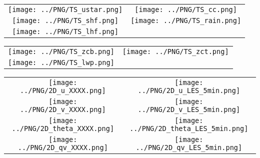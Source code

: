 \documentclass{article}
\begin{document}

\begin{table}
  \begin{tabular}{cc}
    \texttt{[image: ../PNG/TS\_ustar.png]} & \texttt{[image: ../PNG/TS\_cc.png]}   \\ 
    \texttt{[image: ../PNG/TS\_shf.png]}   & \texttt{[image: ../PNG/TS\_rain.png]}  \\
    \texttt{[image: ../PNG/TS\_lhf.png]}   & 
  \end{tabular}
\end{table}

\newpage

\begin{table}
  \begin{tabular}{cc}
    \texttt{[image: ../PNG/TS\_zcb.png]} &  \texttt{[image: ../PNG/TS\_zct.png]} \\
    \texttt{[image: ../PNG/TS\_lwp.png]} &  %
  \end{tabular}
\end{table}

\newpage



\begin{table}
  \begin{tabular}{cc}
     \texttt{[image: ../PNG/2D\_u\_XXXX.png]}     & \texttt{[image: ../PNG/2D\_u\_LES\_5min.png]}     \\
     \texttt{[image: ../PNG/2D\_v\_XXXX.png]}     & \texttt{[image: ../PNG/2D\_v\_LES\_5min.png]}     \\
     \texttt{[image: ../PNG/2D\_theta\_XXXX.png]} & \texttt{[image: ../PNG/2D\_theta\_LES\_5min.png]} \\
     \texttt{[image: ../PNG/2D\_qv\_XXXX.png]}    & \texttt{[image: ../PNG/2D\_qv\_LES\_5min.png]}
  \end{tabular}
\end{table}
\end{document}
